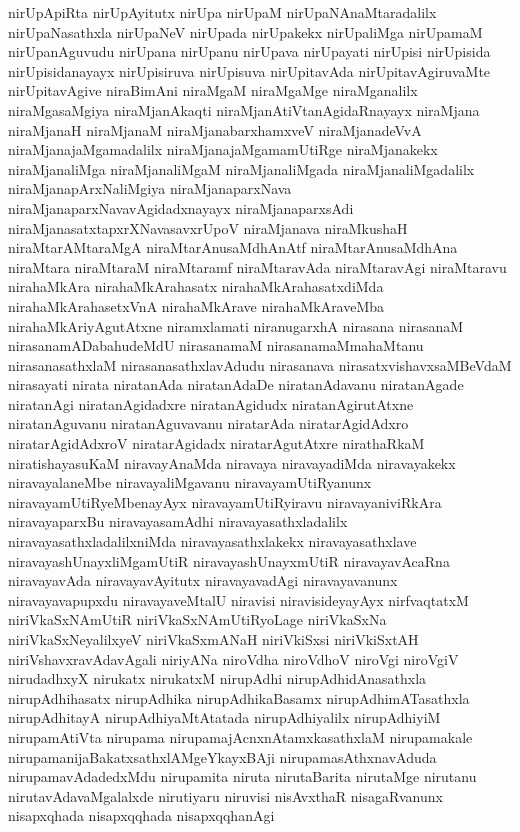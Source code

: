{nirUpApiRta
nirUpAyitutx
nirUpa
nirUpaM
nirUpaNAnaMtaradalilx
nirUpaNasathxla
nirUpaNeV
nirUpada
nirUpakekx
nirUpaliMga
nirUpamaM
nirUpanAguvudu
nirUpana
nirUpanu
nirUpava
nirUpayati
nirUpisi
nirUpisida
nirUpisidanayayx
nirUpisiruva
nirUpisuva
nirUpitavAda
nirUpitavAgiruvaMte
nirUpitavAgive
niraBimAni
niraMgaM
niraMgaMge
niraMganalilx
niraMgasaMgiya
niraMjanAkaqti
niraMjanAtiVtanAgidaRnayayx
niraMjana
niraMjanaH
niraMjanaM
niraMjanabarxhamxveV
niraMjanadeVvA
niraMjanajaMgamadalilx
niraMjanajaMgamamUtiRge
niraMjanakekx
niraMjanaliMga
niraMjanaliMgaM
niraMjanaliMgada
niraMjanaliMgadalilx
niraMjanapArxNaliMgiya
niraMjanaparxNava
niraMjanaparxNavavAgidadxnayayx
niraMjanaparxsAdi
niraMjanasatxtapxrXNavasavxrUpoV
niraMjanava
niraMkushaH
niraMtarAMtaraMgA
niraMtarAnusaMdhAnAtf
niraMtarAnusaMdhAna
niraMtara
niraMtaraM
niraMtaramf
niraMtaravAda
niraMtaravAgi
niraMtaravu
nirahaMkAra
nirahaMkArahasatx
nirahaMkArahasatxdiMda
nirahaMkArahasetxVnA
nirahaMkArave
nirahaMkAraveMba
nirahaMkAriyAgutAtxne
niramxlamati
niranugarxhA
nirasana
nirasanaM
nirasanamADabahudeMdU
nirasanamaM
nirasanamaMmahaMtanu
nirasanasathxlaM
nirasanasathxlavAdudu
nirasanava
nirasatxvishavxsaMBeVdaM
nirasayati
nirata
niratanAda
niratanAdaDe
niratanAdavanu
niratanAgade
niratanAgi
niratanAgidadxre
niratanAgidudx
niratanAgirutAtxne
niratanAguvanu
niratanAguvavanu
niratarAda
niratarAgidAdxro
niratarAgidAdxroV
niratarAgidadx
niratarAgutAtxre
nirathaRkaM
niratishayasuKaM
niravayAnaMda
niravaya
niravayadiMda
niravayakekx
niravayalaneMbe
niravayaliMgavanu
niravayamUtiRyanunx
niravayamUtiRyeMbenayAyx
niravayamUtiRyiravu
niravayaniviRkAra
niravayaparxBu
niravayasamAdhi
niravayasathxladalilx
niravayasathxladalilxniMda
niravayasathxlakekx
niravayasathxlave
niravayashUnayxliMgamUtiR
niravayashUnayxmUtiR
niravayavAcaRna
niravayavAda
niravayavAyitutx
niravayavadAgi
niravayavanunx
niravayavapupxdu
niravayaveMtalU
niravisi
niravisideyayAyx
nirfvaqtatxM
niriVkaSxNAmUtiR
niriVkaSxNAmUtiRyoLage
niriVkaSxNa
niriVkaSxNeyalilxyeV
niriVkaSxmANaH
niriVkiSxsi
niriVkiSxtAH
niriVshavxravAdavAgali
niriyANa
niroVdha
niroVdhoV
niroVgi
niroVgiV
nirudadhxyX
nirukatx
nirukatxM
nirupAdhi
nirupAdhidAnasathxla
nirupAdhihasatx
nirupAdhika
nirupAdhikaBasamx
nirupAdhimATasathxla
nirupAdhitayA
nirupAdhiyaMtAtatada
nirupAdhiyalilx
nirupAdhiyiM
nirupamAtiVta
nirupama
nirupamajAcnxnAtamxkasathxlaM
nirupamakale
nirupamanijaBakatxsathxlAMgeYkayxBAji
nirupamasAthxnavAduda
nirupamavAdadedxMdu
nirupamita
niruta
nirutaBarita
nirutaMge
nirutanu
nirutavAdavaMgalalxde
nirutiyaru
niruvisi
nisAvxthaR
nisagaRvanunx
nisapxqhada
nisapxqqhada
nisapxqqhanAgi
}
